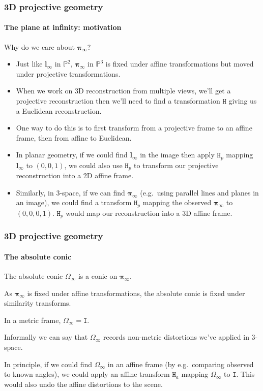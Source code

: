 \documentclass[aspectratio=169]{beamer}
\renewcommand{\vec}[1]{\boldsymbol{#1}}
\newcommand{\mat}[1]{\mathtt{#1}}
\def\Pset{\mathbb{P}}
\begin{document}
\begin{frame}
\frametitle{3D projective geometry}
\framesubtitle{The plane at infinity: motivation}

Why do we care about $\vec{\pi}_{\infty}$?
\begin{itemize}
\item Just like $\vec{l}_{\infty}$ in $\Pset^2$, $\vec{\pi}_{\infty}$
  in $\Pset^3$ is \alert{fixed} under \alert{affine} transformations
  but \alert{moved} under \alert{projective} transformations.
\item When we work on 3D \alert{reconstruction} from multiple views,
  we'll get a \alert{projective reconstruction} then we'll need to
  find a transformation $\mat{H}$ giving us a \alert{Euclidean
  reconstruction}.
\item One way to do this is to first transform from a projective frame
  to an affine frame, then from affine to Euclidean.
\item In \alert{planar} geometry, if we could find $\vec{l}_{\infty}$
  in the image then apply $\mat{H}_p$ mapping $\vec{l}_{\infty}$ to
  $(0,0,1)$, we could also use $\mat{H}_p$ to transform our projective
  reconstruction into a \alert{2D affine frame}.
\item Similarly, in 3-space, if we can find $\vec{\pi}_{\infty}$
  (e.g.\ using parallel lines and planes in an image), we could find a
  transform $\mat{H}_p$ mapping the observed $\vec{\pi}_{\infty}$ to
  $(0,0,0,1)$.  $\mat{H}_p$ would map our reconstruction into a
  \alert{3D affine frame}.
\end{itemize}

\end{frame}

\begin{frame}
\frametitle{3D projective geometry}
\framesubtitle{The absolute conic}

The \alert{absolute conic} $\mat{\Omega}_{\infty}$ is a conic on
$\vec{\pi}_{\infty}$.

\medskip

As $\vec{\pi}_{\infty}$ is fixed under affine transformations, the
absolute conic is \alert{fixed under similarity transforms}.

\medskip

In a metric frame, $\mat{\Omega}_{\infty} = \mat{I}$.

\medskip

Informally we can say that $\mat{\Omega}_{\infty}$ records
\alert{non-metric distortions} we've applied in 3-space.

\medskip

In principle, if we could find $\mat{\Omega}_{\infty}$ in an affine
frame (by e.g.\ comparing observed to known angles), we could apply an
affine transform $\mat{H}_a$ mapping $\mat{\Omega}_{\infty}$ to
$\mat{I}$.  This would also undo the affine distortions to the scene.

\end{frame}
\end{document}
